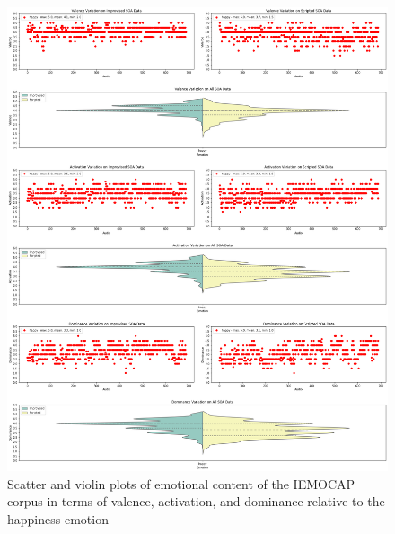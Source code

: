 \begin{figure}[H]
	\centering
	\includegraphics[width=1\linewidth]{figs/appendix/IEMOCAP_data_study/happyScatterViolins.png}
	\caption{Scatter and violin plots of emotional content of the IEMOCAP corpus in terms of valence, activation, and dominance relative to the happiness emotion}
	\label{fig:happyScatterViolins}
\end{figure}


